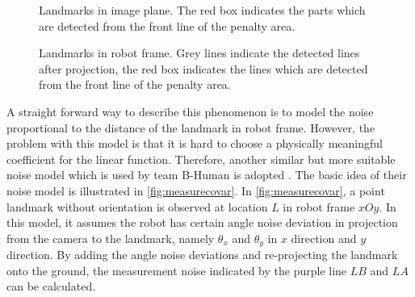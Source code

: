 \begin{figure}[h!]
  \centering
{}
\caption[Landmarks in image plane]{Landmarks in image plane. The red box indicates the parts which are detected from the front line of the penalty area.}
  \label{fig:landmarkImagePlane}
\end{figure}


\begin{figure}[h!]
  \centering
{}
\caption[Landmarks in robot frame]{Landmarks in robot frame. Grey lines indicate the detected lines after projection, the red box indicates the lines which are detected from the front line of the penalty area.}
  \label{fig:landmarkRobotFrame}
\end{figure}

A straight forward way to describe this phenomenon is to model the noise proportional to the distance of the landmark in robot frame. However, the problem with this model is that it is hard to choose a physically meaningful coefficient for the linear function. Therefore, another similar but more suitable noise model which is used by team B-Human is adopted \cite{Bhuman}. The basic idea of their noise model is illustrated in \autoref{fig:measurecovar}. In \autoref{fig:measurecovar}, a point landmark without orientation is observed at location $L$ in robot frame $xOy$. In this model, it assumes the robot has certain angle noise deviation in projection from the camera to the landmark, namely $\theta_{x}$ and $\theta_{y}$ in $x$ direction and $y$ direction. By adding the angle noise deviations and re-projecting the landmark onto the ground, the measurement noise indicated by the purple line $LB$ and $LA$ can be calculated. 

